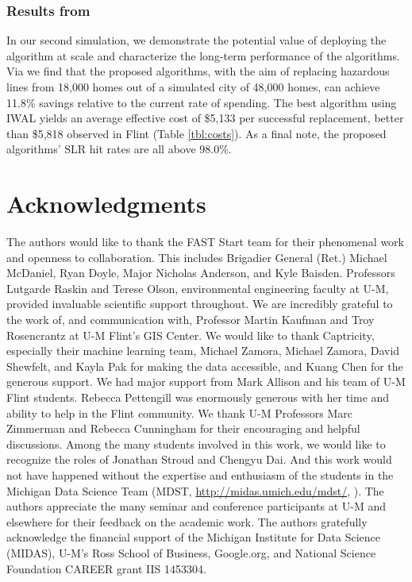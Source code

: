 \documentclass[sigconf]{acmart}
\begin{document}
\subsubsection{Results from \SimulatedFlint}

In our second simulation, we demonstrate the potential value of deploying the algorithm at scale and characterize the long-term performance of the algorithms. Via \SimulatedFlint we find that the proposed algorithms, with the aim of replacing hazardous lines from 18,000 homes out of a simulated city of 48,000 homes, can achieve 11.8\% savings relative to the current rate of spending. The best algorithm using IWAL yields an average effective cost of \$5,133 per successful replacement, better than  \$5,818 observed in Flint (Table \ref{tbl:costs}). As a final note, the proposed algorithms' SLR hit rates are all above 98.0\%. %


\singlespacing


  
\section*{Acknowledgments}

The authors would like to thank the FAST Start team for their phenomenal work and openness to collaboration. This includes Brigadier General (Ret.) Michael McDaniel, Ryan Doyle, Major Nicholas Anderson, and Kyle Baisden. Professors Lutgarde Raskin and Terese Olson, environmental engineering faculty at U-M, provided invaluable scientific support throughout. We are incredibly grateful to the work of, and communication with, Professor Martin Kaufman and Troy Rosencrantz at U-M Flint's GIS Center. We would like to thank Captricity, especially their machine learning team, Michael Zamora, Michael Zamora, David Shewfelt, and Kayla Pak for making the data accessible, and Kuang Chen for the generous support. We had major support from Mark Allison and his team of U-M Flint students. Rebecca Pettengill was enormously generous with her time and ability to help in the Flint community. We thank U-M Professors Marc Zimmerman and Rebecca Cunningham for their encouraging and helpful discussions. Among the many students involved in this work, we would like to recognize the roles of Jonathan Stroud and Chengyu Dai. And this work would not have happened without the expertise and enthusiasm of the students in the Michigan Data Science Team (MDST, \url{http://midas.umich.edu/mdst/}, \cite{farahi2018mdst}). The authors appreciate the many seminar and conference participants at U-M and elsewhere for their feedback on the academic work. The authors gratefully acknowledge the financial support of the Michigan Institute for Data Science (MIDAS), U-M's Ross School of Business, Google.org, and National Science Foundation CAREER grant IIS 1453304.




\balance


\clearpage
\end{document}
